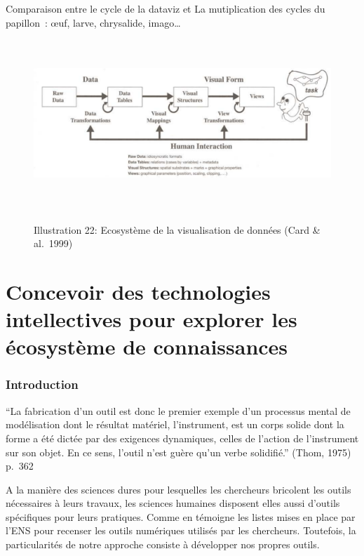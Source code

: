 \documentclass[
  letterpaper,
  DIV=11,
  numbers=noendperiod]{scrreprt}
\begin{document}
Comparaison entre le cycle de la dataviz et La mutiplication des cycles
du papillon~: œuf, larve, chrysalide, imago\ldots{}

\begin{figure}

{\centering \includegraphics[width=17cm,height=6.276cm]{media/100000010000049D000001B4653BE7F72C3CCD80.png}

}

\caption{\\
Illustration 22: Ecosystème de la visualisation de données (Card \&
al.~1999)}

\end{figure}

\part{Concevoir des technologies intellectives pour explorer les
écosystème de connaissances}

\hypertarget{introduction-1}{%
\section*{Introduction}\label{introduction-1}}


``La fabrication d'un outil est donc le premier exemple d'un processus
mental de modélisation dont le résultat matériel, l'instrument, est un
corps solide dont la forme a été dictée par des exigences dynamiques,
celles de l'action de l'instrument sur son objet. En ce sens, l'outil
n'est guère qu'un verbe solidifié.'' (Thom, 1975) p.~362

A la manière des sciences dures pour lesquelles les chercheurs bricolent
les outils nécessaires à leurs travaux, les sciences humaines disposent
elles aussi d'outils spécifiques pour leurs pratiques. Comme en témoigne
les listes mises en place par l'ENS pour recenser les outils numériques
utilisés par les chercheurs. Toutefois, la particularités de notre
approche consiste à développer nos propres outils.
\end{document}
